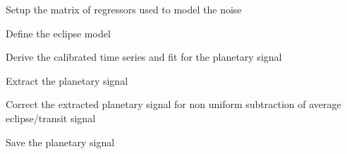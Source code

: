 \documentclass[a4paper,11pt,english]{sphinxmanual}
\begin{document}
Setup the matrix of regressors used to model the noise

%
\begin{sphinxVerbatim}[commandchars=\\\{\}]
\end{sphinxVerbatim}

Define the eclipse model

%
\begin{sphinxVerbatim}[commandchars=\\\{\}]
\end{sphinxVerbatim}

Derive the calibrated time series and fit for the planetary signal

%
\begin{sphinxVerbatim}[commandchars=\\\{\}]
\end{sphinxVerbatim}

Extract the planetary signal

%
\begin{sphinxVerbatim}[commandchars=\\\{\}]
\end{sphinxVerbatim}

Correct the extracted planetary signal for non uniform subtraction of average eclipse/transit signal

%
\begin{sphinxVerbatim}[commandchars=\\\{\}]
\end{sphinxVerbatim}

Save the planetary signal

%
\begin{sphinxVerbatim}[commandchars=\\\{\}]
\end{sphinxVerbatim}
\end{document}
